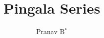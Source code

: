 \documentclass[journal,12pt,twocolumn]{IEEEtran}
\begin{document}
\let\StandardTheFigure\thefigure
\renewcommand{\thefigure}{\theproblem}



\def\putbox#1#2#3{\makebox[0in][l]{\makebox[#1][l]{}\raisebox{\baselineskip}[0in][0in]{\raisebox{#2}[0in][0in]{#3}}}}
     \def\rightbox#1{\makebox[0in][r]{#1}}
     \def\centbox#1{\makebox[0in]{#1}}
     \def\topbox#1{\raisebox{-\baselineskip}[0in][0in]{#1}}
     \def\midbox#1{\raisebox{-0.5\baselineskip}[0in][0in]{#1}}

\vspace{3cm}

\title{ 
Pingala Series
}


%
%
%

\author{ Pranav B$^{*}$ %
}%
% 
%
\end{document}
